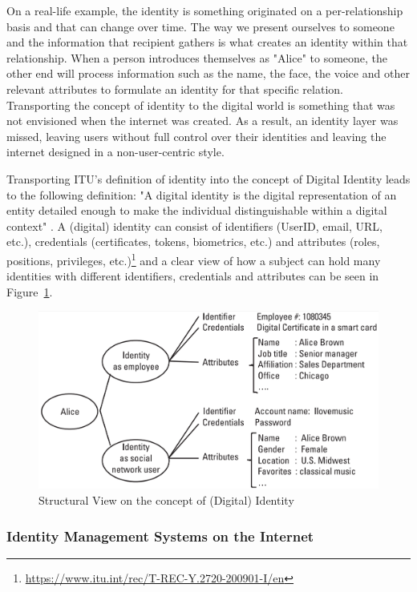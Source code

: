 On a real-life example, the identity is something originated on a per-relationship basis and that can change over time. The way we present ourselves to someone and the information that recipient gathers is what creates an identity within that relationship. When a person introduces themselves as "Alice" to someone, the other end will process information such as the name, the face, the voice and other relevant attributes to formulate an identity for that specific relation. 
Transporting the concept of identity to the digital world is something that was not envisioned when the internet was created. As a result, an identity layer was missed, leaving users without full control over their identities and leaving the internet designed in a non-user-centric style.

Transporting ITU's definition of identity into the concept of Digital Identity leads to the following definition: "A digital identity is the digital representation of an entity detailed enough to make the individual distinguishable within a digital context" \cite{9789261278519}. A (digital) identity can consist of identifiers (UserID, email, URL, etc.), credentials (certificates, tokens, biometrics, etc.) and attributes (roles, positions, privileges, etc.)\footnote{\url{https://www.itu.int/rec/T-REC-Y.2720-200901-I/en}} and a clear view of how a subject can hold many identities with different identifiers, credentials and attributes can be seen in Figure~\ref{fig:identity_definition}.

\begin{figure}[!ht]
    \centering
    \includegraphics[width=0.8\linewidth]{images/Identity_Definition.png}
    \caption[Structural View on the concept of (Digital) Identity]{Structural View on the concept of (Digital) Identity \cite{bertino2010identity}}
    \label{fig:identity_definition}
\end{figure}

\subsubsection{Identity Management Systems on the Internet}
\label{subsubsec:IdMSs}


